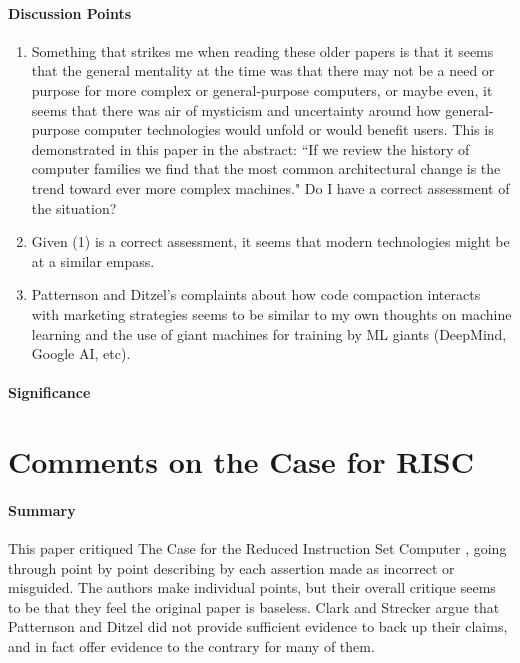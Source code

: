 \paragraph{\textbf{Discussion Points}}
\begin{enumerate}
    \item Something that strikes me when reading these older papers is that it
    seems that the general mentality at the time was that there may not be a
    need or purpose for more complex or general-purpose computers, or maybe
    even, it seems that there was air of mysticism and uncertainty around how
    general-purpose computer technologies would unfold or would benefit users.
    This is demonstrated in this paper in the abstract: ``If we review the
    history of computer families we find that the most common architectural
    change is the trend toward ever more complex machines." Do I have a correct
    assessment of the situation?
    \item Given (1) is a correct assessment, it seems that modern technologies
    might be at a similar empass.
    \item Patternson and Ditzel's complaints about how code compaction interacts
    with marketing strategies seems to be similar to my own thoughts on machine
    learning and the use of giant machines for training by ML giants (DeepMind,
    Google AI, etc).
\end{enumerate}
\paragraph{\textbf{Significance}}

\section {Comments on the Case for RISC \cite{clark1980comments}}

\paragraph{\textbf{Summary}}
This paper critiqued The Case for the Reduced Instruction Set Computer
\cite{patterson1980case}, going through point by point describing by each
assertion made as incorrect or misguided. The authors make individual points,
but their overall critique seems to be that they feel the original paper is
baseless. Clark and Strecker argue that Patternson and Ditzel did not provide
sufficient evidence to back up their claims, and in fact offer evidence to the
contrary for many of them.

